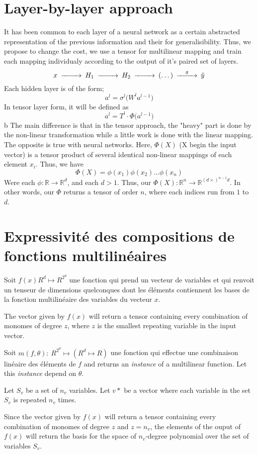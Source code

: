 \documentclass[11pt]{article}
\begin{document}
\section{Layer-by-layer approach}
It has been common to each layer of a neural network as a certain abstracted 
representation of the previous information and their for generalisibility. 
Thus, we propose to change the cost, we use a tensor for multilinear mapping 
and train each mapping individualy according to the output of it's paired set of layers. 
\begin{equation*}
\begin{CD}
    x @>>>H_1 @>>>H_2 @>>>(\dots)@>g>> \hat{y}
\end{CD}
\end{equation*}
Each hidden layer is of the form;
\begin{equation*}
    a^l = \sigma^l \bigl( W^l a^{l-1} \bigr)
\end{equation*}
In tensor layer form, it will be defined as 
\begin{equation*}
    a^l = T^l \cdot \Phi \bigl( a^{l-1} \bigr)
\end{equation*}b
The main difference is that in the tensor approach, the "heavy" part is done by the non-linear transformation while a little work is done with the linear mapping. The opposite is true with neural networks. Here, $\Phi(X)$ (X begin the input vector) is a tensor product of several identical non-linear mappings of each element $x_i$. Thus, we have 
\begin{equation*}
    \Phi(X) = \phi(x_1)\phi(x_2)\dots\phi(x_n)
\end{equation*}
Were each $\phi : \mathbb{R} \rightarrow \mathbb{R}^d$, and each $d > 1$. Thus, our $\Phi(X) : \mathbb{R}^n \rightarrow \mathbb{R}^{ (d \times)^{n-1}d} $. In other words, our $\Phi$ returns a tensor of order $n$, where each indices run from $1$ to $d$.

\section*{Expressivité des compositions de fonctions multilinéaires}
Soit $f(x) R^d \mapsto R^{2^d}$ une fonction qui prend un 
vecteur de variables et qui renvoit un tenseur de dimensions quelconques
dont les éléments contiennent les bases de la fonction multilinéaire des
variables du vecteur $x$. 

The vector given by $f(x)$ will return a tensor containing
every combination of monomes of degree $z$, where $z$ is the smallest
repeating variable in the input vector.

Soit $m(f, \theta): \ R^{2^d} \mapsto (R^d \mapsto R)$ une fonction qui effectue une 
combinaison linéaire des éléments de $f$ and returns an \textit{instance} of
a multilinear function. Let this \textit{instance} depend on $\theta$. 

Let $S_v$ be a set of $n_v$ variables.
Let $v*$ be a vector where each variable in the set $S_v$ is repeated $n_v$ times. 

Since the vector given by $f(x)$ will return a tensor containing
every combination of monomes of degree $z$ and $z = n_v$, the elements
of the ouput of $f(x)$ will return the basis for the space 
of $n_v$-degree polynomial over the set of variables $S_v$. 
\end{document}
